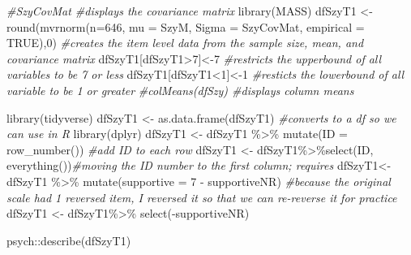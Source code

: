\documentclass[
  english,
]{book}
\newenvironment{Shaded}{\begin{snugshade}}{\end{snugshade}}
\newcommand{\AttributeTok}[1]{\textcolor[rgb]{0.77,0.63,0.00}{#1}}
\newcommand{\CommentTok}[1]{\textcolor[rgb]{0.56,0.35,0.01}{\textit{#1}}}
\newcommand{\ConstantTok}[1]{\textcolor[rgb]{0.00,0.00,0.00}{#1}}
\newcommand{\DecValTok}[1]{\textcolor[rgb]{0.00,0.00,0.81}{#1}}
\newcommand{\FunctionTok}[1]{\textcolor[rgb]{0.00,0.00,0.00}{#1}}
\newcommand{\NormalTok}[1]{#1}
\newcommand{\OtherTok}[1]{\textcolor[rgb]{0.56,0.35,0.01}{#1}}
\newcommand{\SpecialCharTok}[1]{\textcolor[rgb]{0.00,0.00,0.00}{#1}}
\begin{document}
\begin{Shaded}
\begin{Highlighting}[]
\CommentTok{\#SzyCovMat \#displays the covariance matrix}
\FunctionTok{library}\NormalTok{(MASS)}
\NormalTok{dfSzyT1 }\OtherTok{\textless{}{-}} \FunctionTok{round}\NormalTok{(}\FunctionTok{mvrnorm}\NormalTok{(}\AttributeTok{n=}\DecValTok{646}\NormalTok{, }\AttributeTok{mu =}\NormalTok{ SzyM, }\AttributeTok{Sigma =}\NormalTok{ SzyCovMat, }\AttributeTok{empirical =} \ConstantTok{TRUE}\NormalTok{),}\DecValTok{0}\NormalTok{) }\CommentTok{\#creates the item level data from the sample size, mean, and covariance matrix}
\NormalTok{dfSzyT1[dfSzyT1}\SpecialCharTok{\textgreater{}}\DecValTok{7}\NormalTok{]}\OtherTok{\textless{}{-}}\DecValTok{7} \CommentTok{\#restricts the upperbound of all variables to be 7 or less}
\NormalTok{dfSzyT1[dfSzyT1}\SpecialCharTok{\textless{}}\DecValTok{1}\NormalTok{]}\OtherTok{\textless{}{-}}\DecValTok{1} \CommentTok{\#resticts the lowerbound of all variable to be 1 or greater}
\CommentTok{\#colMeans(dfSzy) \#displays column means}

\FunctionTok{library}\NormalTok{(tidyverse)}
\NormalTok{dfSzyT1 }\OtherTok{\textless{}{-}} \FunctionTok{as.data.frame}\NormalTok{(dfSzyT1) }\CommentTok{\#converts to a df so we can use in R}
\FunctionTok{library}\NormalTok{(dplyr)}
\NormalTok{dfSzyT1 }\OtherTok{\textless{}{-}}\NormalTok{ dfSzyT1 }\SpecialCharTok{\%\textgreater{}\%} \FunctionTok{mutate}\NormalTok{(}\AttributeTok{ID =} \FunctionTok{row\_number}\NormalTok{()) }\CommentTok{\#add ID to each row}
\NormalTok{dfSzyT1 }\OtherTok{\textless{}{-}}\NormalTok{ dfSzyT1}\SpecialCharTok{\%\textgreater{}\%}\FunctionTok{select}\NormalTok{(ID, }\FunctionTok{everything}\NormalTok{())}\CommentTok{\#moving the ID number to the first column; requires}
\NormalTok{dfSzyT1}\OtherTok{\textless{}{-}}\NormalTok{ dfSzyT1 }\SpecialCharTok{\%\textgreater{}\%}
  \FunctionTok{mutate}\NormalTok{(}\AttributeTok{supportive =} \DecValTok{7} \SpecialCharTok{{-}}\NormalTok{ supportiveNR) }\CommentTok{\#because the original scale had 1 reversed item, I reversed it so that we can re{-}reverse it for practice}
\NormalTok{dfSzyT1 }\OtherTok{\textless{}{-}}\NormalTok{ dfSzyT1}\SpecialCharTok{\%\textgreater{}\%}
  \FunctionTok{select}\NormalTok{(}\SpecialCharTok{{-}}\NormalTok{supportiveNR)}
\end{Highlighting}
\end{Shaded}

\begin{Shaded}
\begin{Highlighting}[]
\NormalTok{psych}\SpecialCharTok{::}\FunctionTok{describe}\NormalTok{(dfSzyT1)}
\end{Highlighting}
\end{Shaded}
\end{document}
